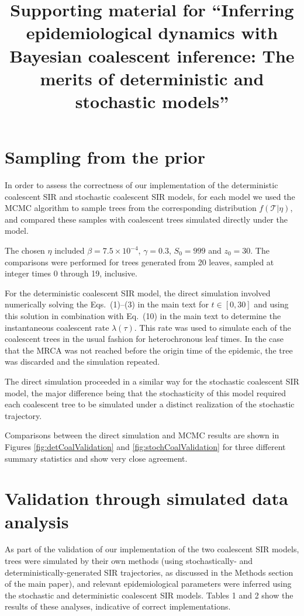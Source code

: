 \documentclass[10pt]{article}
\title{Supporting material for ``Inferring epidemiological dynamics with Bayesian coalescent inference:  The merits of deterministic and stochastic models''}
\date{}
\newcommand{\tree}{\mathcal{T}}
\begin{document}
\maketitle{}


\section{Sampling from the prior}

In order to assess the correctness of our implementation of the
deterministic coalescent SIR and stochastic coalescent SIR models, for
each model we used the MCMC algorithm to sample trees from the
corresponding distribution $f(\tree|\eta)$, and compared these samples
with coalescent trees simulated directly under the model.

The chosen $\eta$ included $\beta=7.5\times 10^{-4}$, $\gamma=0.3$,
$S_0=999$ and $z_0=30$. The comparisons were performed for trees
generated from 20 leaves, sampled at integer times 0 through 19,
inclusive.

For the deterministic coalescent SIR model, the direct simulation
involved numerically solving the Eqs.~(1)--(3) in the main text for
$t\in[0,30]$ and using this solution in combination with Eq.~(10)
in the main text to determine the instantaneous coalescent rate
$\lambda(\tau)$. This rate was used to simulate each of the coalescent
trees in the usual fashion for heterochronous leaf times.  In the case
that the MRCA was not reached before the origin time of the epidemic,
the tree was discarded and the simulation repeated.

The direct simulation proceeded in a similar way for the stochastic
coalescent SIR model, the major difference being that the
stochasticity of this model required each coalescent tree to be
simulated under a distinct realization of the stochastic trajectory.

Comparisons between the direct simulation and MCMC results are shown
in Figures \ref{fig:detCoalValidation} and
\ref{fig:stochCoalValidation} for three different summary
statistics and show very close agreement.

\vspace{3 mm}

\section{Validation through simulated data analysis}
As part of the validation of our implementation of the two coalescent SIR models, trees were 
simulated by their own methods (using stochastically- and deterministically-generated SIR trajectories, 
as discussed in the Methods section of the main paper), and relevant epidemiological parameters were inferred using the 
stochastic and deterministic coalescent SIR models.  Tables 1 and 2 show the results of these analyses, 
indicative of correct implementations. 
\end{document}
